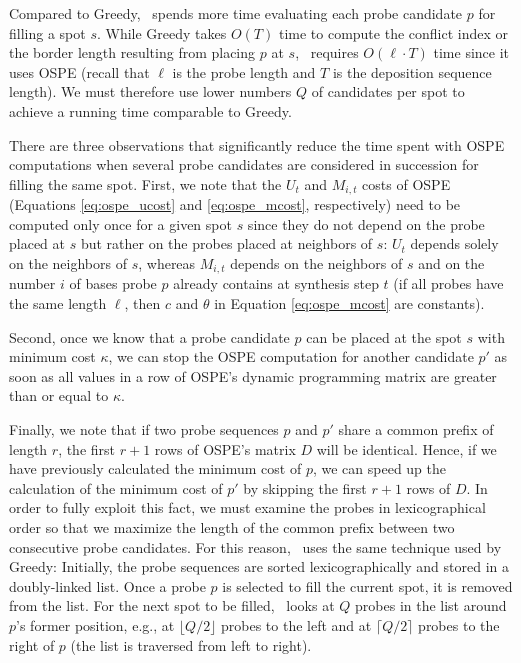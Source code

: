 Compared to Greedy, \Greedyplus\ spends more time evaluating each probe
candidate $p$ for filling a spot $s$. While Greedy takes $O(T)$ time to compute
the conflict index or the border length resulting from placing $p$ at $s$,
\Greedyplus\ requires $O(\ell \cdot T)$ time since it uses OSPE (recall that
$\ell$ is the probe length and $T$ is the deposition sequence length). We must
therefore use lower numbers $Q$ of candidates per spot to achieve a running
time comparable to Greedy.

There are three observations that significantly reduce the time spent with OSPE
computations when several probe candidates are considered in succession for
filling the same spot. First, we note that the $U_t$ and $M_{i,t}$ costs of OSPE
(Equations \ref{eq:ospe_ucost} and \ref{eq:ospe_mcost}, respectively) need to be
computed only once for a given spot $s$ since they do not depend on the probe
placed at $s$ but rather on the probes placed at neighbors of $s$: $U_t$ depends
solely on the neighbors of $s$, whereas $M_{i,t}$ depends on the neighbors of
$s$ and on the number $i$ of bases probe $p$ already contains at synthesis step
$t$ (if all probes have the same length $\ell$, then $c$ and $\theta$ in
Equation \ref{eq:ospe_mcost} are constants).

Second, once we know that a probe candidate $p$ can be placed at the spot $s$
with minimum cost $\kappa$, we can stop the OSPE computation for another
candidate $p'$ as soon as all values in a row of OSPE's dynamic programming
matrix are greater than or equal to $\kappa$.

Finally, we note that if two probe sequences $p$ and $p'$ share a common prefix
of length $r$, the first $r + 1$ rows of OSPE's matrix $D$ will be identical.
Hence, if we have previously calculated the minimum cost of $p$, we can speed up
the calculation of the minimum cost of $p'$ by skipping the first $r + 1$ rows
of $D$. In order to fully exploit this fact, we must examine the probes in
lexicographical order so that we maximize the length of the common prefix
between two consecutive probe candidates. For this reason, \Greedyplus\ uses the
same technique used by Greedy: Initially, the probe sequences are sorted
lexicographically and stored in a doubly-linked list. Once a probe $p$ is
selected to fill the current spot, it is removed from the list. For the next
spot to be filled, \Greedyplus\ looks at $Q$ probes in the list around $p$'s
former position, e.g., at $\lfloor Q/2 \rfloor$ probes to the left and at
$\lceil Q/2 \rceil$ probes to the right of $p$ (the list is traversed from left
to right).

